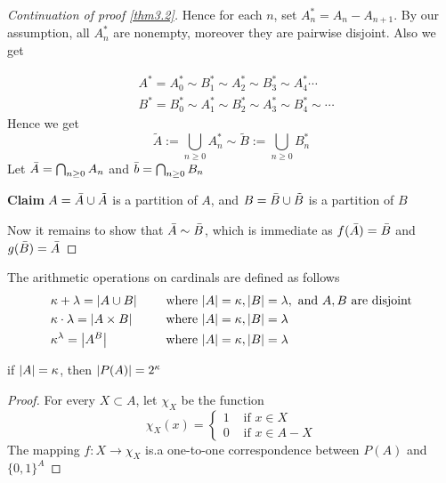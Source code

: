 \documentclass[11pt]{article}
\begin{document}
\begin{proof}[Continuation of proof \ref{thm3.2}]
Hence for each \(n\), set \(A_n^*=A_n-A_{n+1}\). By our assumption, all \(A_n^*\) are nonempty,
moreover they are pairwise disjoint. Also we get

\begin{align*}
    &A^*=A^*_0\sim B^*_1\sim A^*_2\sim B^*_3\sim A^*_4\cdots\\
    &B^*=B^*_0\sim A^*_1\sim B^*_2\sim A^*_3\sim B^*_4\sim\cdots
    \end{align*}
Hence we get
\begin{equation*}
\tilde{A}:=\bigcup_{n\ge 0}A_n^*\sim\tilde{B}:=\bigcup_{n\ge 0}B_n^*
\end{equation*}
Let \(\bar{A}=\bigcap_{n\ge 0}A_n\) and \(\bar{b}=\bigcap_{n\ge 0}B_n\)

\textbf{Claim} \(A=\bar{A}\cup\tilde{A}\) is a partition of \(A\), and \(B=\bar{B}\cup\tilde{B}\) is a partition
of \(B\)

Now it remains to show that \(\bar{A}\sim\bar{B}\), which is immediate as \(f(\bar{A})=\bar{B}\) and \(g(\bar{B})=\bar{A}\)
\end{proof}

The arithmetic operations on cardinals are defined as follows
\begin{alignat*}{2}
&\kappa+\lambda=\abs{A\cup B}\quad&&\text{ where }\abs{A}=\kappa,\abs{B}=\lambda,\text{ and }A,B\text{ are disjoint}\\
&\kappa\cdot\lambda=\abs{A\times B}&&\text{ where }\abs{A}=\kappa,\abs{B}=\lambda\\
&\kappa^\lambda=\abs{A^B}&&\text{ where }\abs{A}=\kappa,\abs{B}=\lambda
\end{alignat*}

\begin{lemma}[]
if \(\abs{A}=\kappa\), then \(\abs{P(A)}=2^\kappa\)
\end{lemma}

\begin{proof}
For every \(X\subset A\), let \(\chi_X\) be the function
\begin{equation*}
\chi_X(x)=
\begin{cases}
1&\text{ if }x\in X\\
0&\text{ if }x\in A-X
\end{cases}
\end{equation*}
The mapping \(f:X\to\chi_X\) is.a one-to-one correspondence between \(P(A)\) and \(\{0,1\}^A\)
\end{proof}
\end{document}
